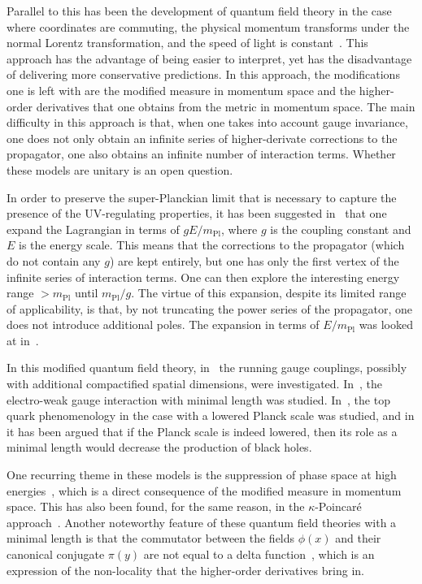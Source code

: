 \documentclass{article}
\begin{document}
Parallel to this has been the development of quantum field theory in the case where coordinates are
commuting, the physical momentum transforms under the normal Lorentz transformation, and the speed
of light is constant~\cite{Hossenfelder:2003jz}.
This approach has the advantage of being easier to interpret, yet has the disadvantage of delivering more
conservative predictions. In this approach, the modifications one is left with are the modified measure in
momentum space and the higher-order derivatives that one obtains from the metric in momentum space. 
The main difficulty in this
approach is that, when one takes into account gauge invariance, one does not only obtain an infinite
series of higher-derivate corrections to the propagator, one also obtains an infinite number of 
interaction terms. Whether these models are unitary is an open question.

In order to preserve the super-Planckian limit that is necessary to capture the presence
of the UV-regulating properties, it has been suggested in~\cite{Hossenfelder:2003jz} that one
expand the Lagrangian in terms of $g E/m_{\mathrm{Pl}}$, where $g$ is the coupling constant 
and $E$ is the energy scale. This means that the corrections to the propagator (which
do not contain any $g$) are kept entirely, but one has only the first vertex of the infinite
series of interaction terms. One can then explore the interesting energy range $>m_{\mathrm{Pl}}$ until $m_{\mathrm{Pl}}/g$. 
The virtue of this expansion, despite its limited range of applicability, is that, by
not truncating the power series of the propagator, one does not introduce additional
poles. The expansion in terms of
$E/m_{\mathrm{Pl}}$ was looked at in~\cite{Kober:2010sj}. 

In this modified quantum field theory, in~\cite{Hossenfelder:2004up} the running gauge couplings, possibly with
additional compactified spatial dimensions, were investigated. In~\cite{Kober:2011dn}, 
the electro-weak gauge interaction with minimal length was studied. In~\cite{Mimasu:2011sa},
the top quark phenomenology in the case with a lowered Planck scale was studied, and in
\cite{Hossenfelder:2004ze,Cavaglia:2004jw} it has been argued that if the Planck scale is indeed lowered, then
its role as a minimal length would decrease the production of black holes. 

One recurring
theme in these models is the suppression of phase space at high energies~\cite{Hossenfelder:2003jz}, which is
a direct consequence of the modified measure in momentum space. This has also been found,
for the same reason, in the $\kappa$-Poincar\'e approach~\cite{VilelaMendes:2004up}.
Another noteworthy feature of these quantum field theories with a minimal length is that the 
commutator between the fields $\phi(x)$ and their
canonical conjugate $\pi(y)$ are not equal to a delta function~\cite{Hossenfelder:2007fy,Maziashvili:2011dx},
which is an expression of the non-locality that the higher-order derivatives bring in. 
\end{document}
